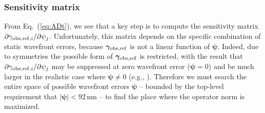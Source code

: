 \documentclass[usenatbib]{mnras}
\begin{document}
\subsubsection{Sensitivity matrix}
\label{as:drift-sens}

From Eq.~(\ref{eq:ADt}), we see that a key step is to compute the
sensitivity matrix $\partial \gamma_{{\rm
obs,ref},i}/\partial\psi_j$. Unfortunately, this matrix depends on the
specific combination of static wavefront errors, because
${\boldsymbol\gamma}_{\rm obs,ref}$ is not a linear function of
${\boldsymbol\psi}$. Indeed, due to symmetries the possible form of
${\boldsymbol\gamma}_{\rm obs,ref}$ is restricted, with the result
that $\partial \gamma_{{\rm obs,ref},i}/\partial\psi_j$ may be
suppressed at zero wavefront error (${\boldsymbol\psi}=0$) and be much
larger in the realistic case where ${\boldsymbol\psi}\neq 0$ (e.g., 
\cite{2010SPIE.7731E..1EN}). Therefore we must search the
entire space of possible wavefront errors ${\boldsymbol\psi}$ --
bounded by the top-level requirement that $|{\boldsymbol\psi}|<92\,$nm
-- to find the place where the operator norm is maximized.
\end{document}
